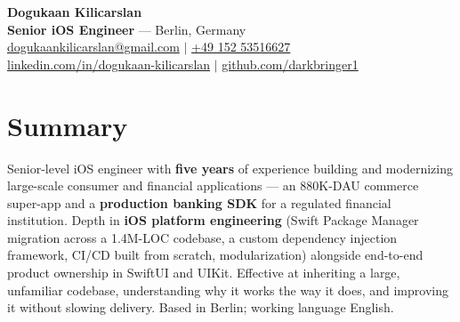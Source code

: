 \documentclass[a4paper,11pt]{article}
\begin{document}
\begin{center}
    \textbf{\huge Dogukaan Kilicarslan} \\ \vspace{4pt}
    \small \textbf{Senior iOS Engineer} --- Berlin, Germany \\ \vspace{4pt}
    \href{mailto:dogukaankilicarslan@gmail.com}{dogukaankilicarslan@gmail.com} $|$
    \href{tel:+4915253516627}{+49 152 53516627} \\ \vspace{2pt}
    \href{https://www.linkedin.com/in/dogukaan-kilicarslan}{linkedin.com/in/dogukaan-kilicarslan} $|$
    \href{https://github.com/darkbringer1}{github.com/darkbringer1}
\end{center}

\section{Summary}
\small{Senior-level iOS engineer with \textbf{five years} of experience building and modernizing large-scale consumer and financial applications --- an 880K-DAU commerce super-app and a \textbf{production banking SDK} for a regulated financial institution. Depth in \textbf{iOS platform engineering} (Swift Package Manager migration across a 1.4M-LOC codebase, a custom dependency injection framework, CI/CD built from scratch, modularization) alongside end-to-end product ownership in SwiftUI and UIKit. Effective at inheriting a large, unfamiliar codebase, understanding why it works the way it does, and improving it without slowing delivery. Based in Berlin; working language English.}

\end{document}
